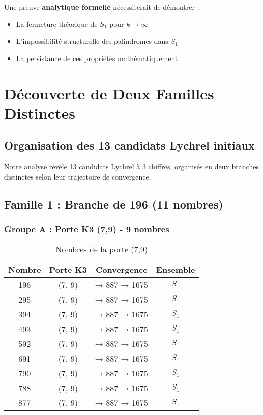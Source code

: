 \documentclass[12pt,a4paper]{article}
\theoremstyle{remark}
\begin{document}
Une preuve \textbf{analytique formelle} nécessiterait de démontrer :
\begin{itemize}
\item La fermeture théorique de $S_1$ pour $k \to \infty$
\item L'impossibilité structurelle des palindromes dans $S_1$
\item La persistance de ces propriétés mathématiquement
\end{itemize}


\section{Découverte de Deux Familles Distinctes}
\label{sec:deux_familles}

\subsection{Organisation des 13 candidats Lychrel initiaux}

Notre analyse révèle 13 candidats Lychrel à 3 chiffres, organisés en deux branches distinctes selon leur trajectoire de convergence.

\subsection{Famille 1 : Branche de 196 (11 nombres)}

\subsubsection{Groupe A : Porte K3 (7,9) - 9 nombres}

\begin{table}[h]
\centering
\caption{Nombres de la porte (7,9)}
\begin{tabular}{cccc}
\toprule
\textbf{Nombre} & \textbf{Porte K3} & \textbf{Convergence} & \textbf{Ensemble}\\
\midrule
196 & (7, 9) & → 887 → 1675 & $S_1$\\
295 & (7, 9) & → 887 → 1675 & $S_1$\\
394 & (7, 9) & → 887 → 1675 & $S_1$\\
493 & (7, 9) & → 887 → 1675 & $S_1$\\
592 & (7, 9) & → 887 → 1675 & $S_1$\\
691 & (7, 9) & → 887 → 1675 & $S_1$\\
790 & (7, 9) & → 887 → 1675 & $S_1$\\
788 & (7, 9) & → 887 → 1675 & $S_1$\\
877 & (7, 9) & → 887 → 1675 & $S_1$\\
\bottomrule
\end{tabular}
\end{table}
\end{document}
